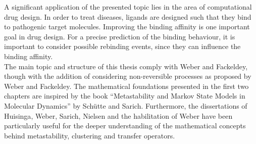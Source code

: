 A significant application of the presented topic lies in the area of computational drug design. %
In order to treat diseases, ligands are designed such that they bind to pathogenic target molecules. %
Improving the binding affinity is one important goal in drug design.
For a precise prediction of the binding behaviour, %
it is important to consider possible rebinding events, since they can influence the binding affinity. %
\\

The main topic and structure of this thesis comply with Weber and Fackeldey\cite{weber2014}, though with the addition of considering non-reversible processes as proposed by Weber and Fackeldey\cite{Weber2017}. %
The mathematical foundations presented in the first two chapters are inspired by the book ``Metastability and Markov State Models in Molecular Dynamics'' by Sch\"utte and Sarich\cite{schutte2013metastability}.
Furthermore, the dissertations of Huisinga\cite{huisinga2001metastability}, Weber\cite{weber2006meshless}, Sarich\cite{sarich2011projected}, Nielsen\cite{nielsen2015transfer} and the habilitation of Weber\cite{weber2011subspace} have been particularly useful for the deeper understanding of the mathematical concepts behind metastability, clustering and transfer operators.



\clearpage